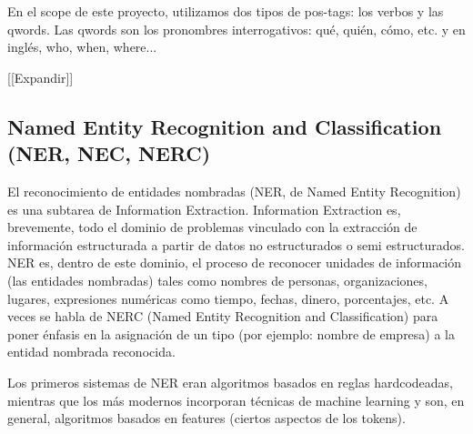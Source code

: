 


\bigskip

En el scope de este proyecto, utilizamos dos tipos de pos-tags: los
verbos y las qwords. Las qwords son los pronombres interrogativos:
qu\'e, qui\'en, c\'omo, etc. y en ingl\'es, who, when, where...\newline

[[Expandir]]

\subsection{Named Entity Recognition and Classification (NER, NEC, NERC)}

El reconocimiento de entidades nombradas (NER, de Named Entity
Recognition) es una subtarea de Information Extraction. Information
Extraction es, brevemente, todo el dominio de problemas vinculado con
la extracci\'on de informaci\'on estructurada a partir de datos no
estructurados o semi estructurados. NER es, dentro de este dominio, el
proceso de reconocer unidades de informaci\'on (las entidades
nombradas) tales como nombres de personas, organizaciones, lugares,
expresiones num\'ericas como tiempo, fechas, dinero, porcentajes, etc.
A veces se habla de NERC (Named Entity Recognition and Classification)
para poner \'enfasis en la asignaci\'on de un tipo (por ejemplo: nombre
de empresa) a la entidad nombrada reconocida.

Los primeros sistemas de NER eran algoritmos basados en reglas
hardcodeadas, mientras que los m\'as modernos incorporan t\'ecnicas de
machine learning y son, en general, algoritmos basados en features
(ciertos aspectos de los tokens).

